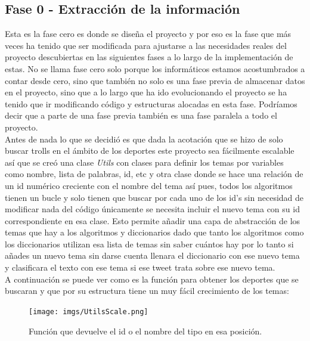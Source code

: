 \documentclass[../all.tex]{subfiles}
\begin{document}
\newpage
\subsection{Fase 0 - Extracción de la información}
	
	Esta es la fase cero es donde se diseña el proyecto y por eso es la fase que más veces ha tenido que ser modificada para ajustarse a las necesidades reales del proyecto descubiertas en las siguientes fases a lo largo de la implementación de estas. No se llama fase cero solo porque los informáticos estamos acostumbrados a contar desde cero, sino que también no solo es una fase previa de almacenar datos en el proyecto, sino que a lo largo que ha ido evolucionando el proyecto se ha tenido que ir modificando código y estructuras alocadas en esta fase. Podríamos decir que a parte de una fase previa también es una fase paralela a todo el proyecto.\\
	
	Antes de nada lo que se decidió es que dada la acotación que se hizo de solo buscar trolls en el ámbito de los deportes este proyecto sea fácilmente escalable así que se creó una clase \textit{Utils} con clases para definir los temas por variables como nombre, lista de palabras, id, etc y otra clase donde se hace una relación de un id numérico creciente con el nombre del tema así pues, todos los algoritmos tienen un bucle y solo tienen que buscar por cada uno de los id’s sin necesidad de modificar nada del código únicamente se necesita incluir el nuevo tema con su id correspondiente en esa clase. Esto permite añadir una capa de abstracción de los temas que hay a los algoritmos y diccionarios dado que tanto los algoritmos como los diccionarios utilizan esa lista de temas sin saber cuántos hay por lo tanto si añades un nuevo tema sin darse cuenta llenara el diccionario con ese nuevo tema y clasificara el texto con ese tema si ese tweet trata sobre ese nuevo tema.\\
	
	 A continuación se puede ver como es la función para obtener los deportes que se buscaran y que por su estructura tiene un muy fácil crecimiento de los temas:

	\begin{figure}[H]
		\centering
		\texttt{[image: imgs/UtilsScale.png]}
		\caption{Función que devuelve el id o el nombre del tipo en esa posición.}
	\end{figure}
\end{document}
